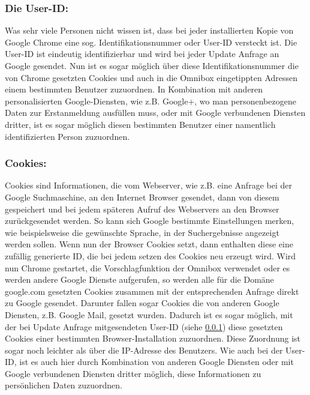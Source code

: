 \documentclass[12pt, a4paper]{llncs}
\begin{document}
	\subsubsection{Die User-ID:}
	\label{User-ID}
	Was sehr viele Personen nicht wissen ist, dass bei jeder installierten Kopie von Google Chrome eine sog. Identifikationsnummer oder User-ID versteckt ist. Die User-ID ist eindeutig identifizierbar und wird bei jeder Update Anfrage an Google gesendet. Nun ist es sogar möglich über diese Identifikationsnummer die von Chrome gesetzten Cookies und auch in die Omnibox eingetippten Adressen einem bestimmten Benutzer zuzuordnen. In Kombination mit anderen personalisierten Google-Diensten, wie z.B. Google+, wo man personenbezogene Daten zur Erstanmeldung ausfüllen muss, oder mit Google verbundenen Diensten dritter, ist es sogar möglich diesen bestimmten Benutzer einer namentlich identifizierten Person zuzuordnen.
	\\
	\subsubsection{Cookies:}
	Cookies sind Informationen, die vom Webserver, wie z.B. eine Anfrage bei der Google Suchmaschine, an den Internet Browser gesendet, dann von diesem gespeichert und bei jedem späteren Aufruf des Webservers an den Browser zurückgesendet werden. So kann sich Google bestimmte Einstellungen merken, wie beispielsweise die gewünschte Sprache, in der Suchergebnisse angezeigt werden sollen. Wenn nun der Browser Cookies setzt, dann enthalten diese eine zufällig generierte ID, die bei jedem setzen des Cookies neu erzeugt wird. Wird nun Chrome gestartet, die Vorschlagfunktion der Omnibox verwendet oder es werden andere Google Dienste aufgerufen, so werden alle für die Domäne google.com gesetzten Cookies zusammen mit der entsprechenden Anfrage direkt zu Google gesendet. Darunter fallen sogar Cookies die von anderen Google Diensten, z.B. Google Mail, gesetzt wurden. Dadurch ist es sogar möglich, mit der bei Update Anfrage mitgesendeten User-ID (siehe \ref*{User-ID}) diese gesetzten Cookies einer bestimmten Browser-Installation zuzuordnen. Diese Zuordnung ist sogar noch leichter als über die IP-Adresse des Benutzers. Wie auch bei der User-ID, ist es auch hier durch Kombination von anderen Google Diensten oder mit Google verbundenen Diensten dritter möglich, diese Informationen zu persönlichen Daten zuzuordnen.
	
\end{document}
